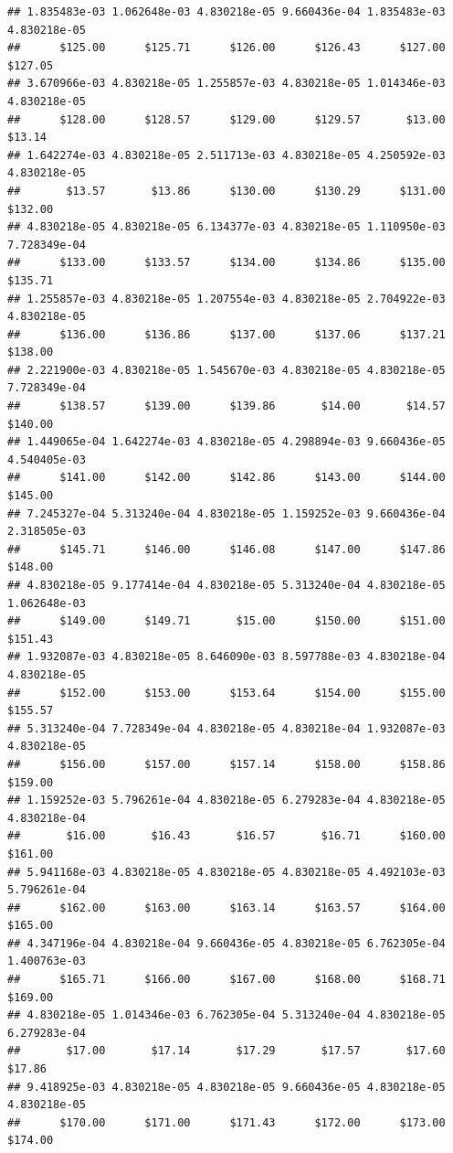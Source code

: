 \begin{verbatim}
## 1.835483e-03 1.062648e-03 4.830218e-05 9.660436e-04 1.835483e-03 4.830218e-05 
##      $125.00      $125.71      $126.00      $126.43      $127.00      $127.05 
## 3.670966e-03 4.830218e-05 1.255857e-03 4.830218e-05 1.014346e-03 4.830218e-05 
##      $128.00      $128.57      $129.00      $129.57       $13.00       $13.14 
## 1.642274e-03 4.830218e-05 2.511713e-03 4.830218e-05 4.250592e-03 4.830218e-05 
##       $13.57       $13.86      $130.00      $130.29      $131.00      $132.00 
## 4.830218e-05 4.830218e-05 6.134377e-03 4.830218e-05 1.110950e-03 7.728349e-04 
##      $133.00      $133.57      $134.00      $134.86      $135.00      $135.71 
## 1.255857e-03 4.830218e-05 1.207554e-03 4.830218e-05 2.704922e-03 4.830218e-05 
##      $136.00      $136.86      $137.00      $137.06      $137.21      $138.00 
## 2.221900e-03 4.830218e-05 1.545670e-03 4.830218e-05 4.830218e-05 7.728349e-04 
##      $138.57      $139.00      $139.86       $14.00       $14.57      $140.00 
## 1.449065e-04 1.642274e-03 4.830218e-05 4.298894e-03 9.660436e-05 4.540405e-03 
##      $141.00      $142.00      $142.86      $143.00      $144.00      $145.00 
## 7.245327e-04 5.313240e-04 4.830218e-05 1.159252e-03 9.660436e-04 2.318505e-03 
##      $145.71      $146.00      $146.08      $147.00      $147.86      $148.00 
## 4.830218e-05 9.177414e-04 4.830218e-05 5.313240e-04 4.830218e-05 1.062648e-03 
##      $149.00      $149.71       $15.00      $150.00      $151.00      $151.43 
## 1.932087e-03 4.830218e-05 8.646090e-03 8.597788e-03 4.830218e-04 4.830218e-05 
##      $152.00      $153.00      $153.64      $154.00      $155.00      $155.57 
## 5.313240e-04 7.728349e-04 4.830218e-05 4.830218e-04 1.932087e-03 4.830218e-05 
##      $156.00      $157.00      $157.14      $158.00      $158.86      $159.00 
## 1.159252e-03 5.796261e-04 4.830218e-05 6.279283e-04 4.830218e-05 4.830218e-04 
##       $16.00       $16.43       $16.57       $16.71      $160.00      $161.00 
## 5.941168e-03 4.830218e-05 4.830218e-05 4.830218e-05 4.492103e-03 5.796261e-04 
##      $162.00      $163.00      $163.14      $163.57      $164.00      $165.00 
## 4.347196e-04 4.830218e-04 9.660436e-05 4.830218e-05 6.762305e-04 1.400763e-03 
##      $165.71      $166.00      $167.00      $168.00      $168.71      $169.00 
## 4.830218e-05 1.014346e-03 6.762305e-04 5.313240e-04 4.830218e-05 6.279283e-04 
##       $17.00       $17.14       $17.29       $17.57       $17.60       $17.86 
## 9.418925e-03 4.830218e-05 4.830218e-05 9.660436e-05 4.830218e-05 4.830218e-05 
##      $170.00      $171.00      $171.43      $172.00      $173.00      $174.00 

\end{verbatim}
